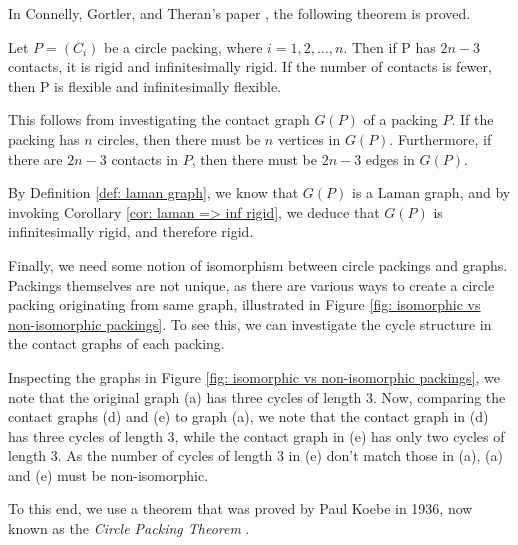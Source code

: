 \begin{flushleft}
In Connelly, Gortler, and Theran's paper \cite{sticky}, the following theorem is proved.
\end{flushleft}

\begin{theorem}
\label{thm: louis thm}
Let $P = (C_i)$ be a circle packing, where $i = 1,2,\hdots, n$. Then if P has $2n-3$ contacts, it is rigid and infinitesimally rigid. If the number of contacts is fewer, then P is flexible and infinitesimally flexible.
\end{theorem}

\begin{flushleft}
This follows from investigating the contact graph $G(P)$ of a packing $P$. If the packing has $n$ circles, then there must be $n$ vertices in $G(P)$. Furthermore, if there are $2n-3$ contacts in $P$, then there must be $2n-3$ edges in $G(P)$.
\end{flushleft}

\begin{flushleft}
By Definition \ref{def: laman graph}, we know that $G(P)$ is a Laman graph, and by invoking Corollary \ref{cor: laman => inf rigid}, we deduce that $G(P)$ is infinitesimally rigid, and therefore rigid. 
\end{flushleft}

\begin{flushleft}
Finally, we need some notion of isomorphism between circle packings and graphs. Packings themselves are not unique, as there are various ways to create a circle packing originating from same graph, illustrated in Figure \ref{fig: isomorphic vs non-isomorphic packings}. To see this, we can investigate the cycle structure in the contact graphs of each packing. 
\end{flushleft}

\begin{flushleft}
Inspecting the graphs in Figure \ref{fig: isomorphic vs non-isomorphic packings}, we note that the original graph (a) has three cycles of length 3. Now, comparing the contact graphs (d) and (e) to graph (a), we note that the contact graph in (d) has three cycles of length 3, while the contact graph in (e) has only two cycles of length 3. As the number of cycles of length 3 in (e) don't match those in (a), (a) and (e) must be non-isomorphic.
\end{flushleft}

\begin{flushleft}
To this end, we use a theorem that was proved by Paul Koebe in 1936, now known as the \textit{Circle Packing Theorem} \cite{circle_packing_theorem}.
\end{flushleft}

